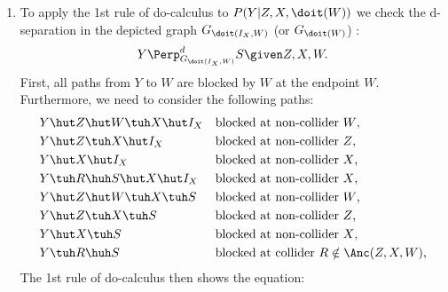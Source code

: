 {\begin{enumerate}
\begin{align*}
             &Y \hut Z \hut W \tuh X \hut I_X && \text{blocked at non-collider $W$,}\\
             &Y \hut Z \tuh X \hut I_X && \text{blocked at non-collider $Z$,}\\
             &Y \hut X \hut I_X && \text{blocked at non-collider $X$,}\\
             &Y \tuh R \huh S \hut X \hut I_X && \text{blocked at non-collider $X$,}
         \end{align*}
         The 2nd rule of do-calculus then shows the equation:
         \begin{align*}
             P(Y|Z,\doit(X,W)) & = P(Y|Z,X,\doit(W)).
         \end{align*}
     \item To apply the 1st rule of do-calculus to $P(Y|Z,X,\doit(W))$ we check the d-separation in the depicted graph $G_{\doit(I_X,W)}$ (or $G_{\doit(W)}$) : 
         \begin{align*}
             Y \Perp^d_{G_{\doit(I_X,W)}} S \given Z,X,W.
         \end{align*}
        First, all paths from $Y$ to $W$ are blocked by $W$ at the endpoint $W$.
         Furthermore, we need to consider the following paths:
         \begin{align*}
             &Y \hut Z \hut W \tuh X \hut I_X && \text{blocked at non-collider $W$,}\\
             &Y \hut Z \tuh X \hut I_X && \text{blocked at non-collider $Z$,}\\
             &Y \hut X \hut I_X && \text{blocked at non-collider $X$,}\\
             &Y \tuh R \huh S \hut X \hut I_X && \text{blocked at non-collider $X$,}\\
             &Y \hut Z \hut W \tuh X \tuh S && \text{blocked at non-collider $W$,}\\
             &Y \hut Z \tuh X \tuh S && \text{blocked at non-collider $Z$,}\\
             &Y \hut X \tuh S && \text{blocked at non-collider $X$,}\\
             &Y \tuh R \huh S && \text{blocked at collider $R \notin \Anc(Z,X,W)$,}
         \end{align*}
         The 1st rule of do-calculus then shows the equation:

\end{enumerate}}
